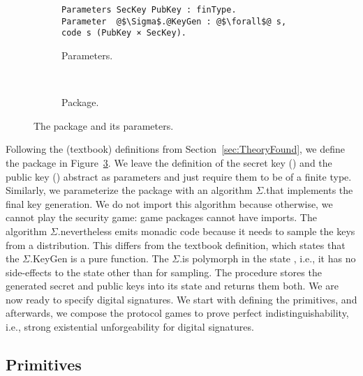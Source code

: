 \begin{figure}
	\centering
    \begin{subfigure}[b]{\columnwidth}
    \centering
       \begin{verbatim}
Parameters SecKey PubKey : finType.
Parameter  @$\Sigma$.@KeyGen : @$\forall$@ s, code s (PubKey × SecKey).
		  	\end{verbatim}
      \caption{Parameters.}
	    \label{fig:keygen:params}
    \end{subfigure}
\\[0.3cm]
  \begin{subfigure}[b]{\columnwidth}
    \centering
    
    \caption{Package.}
    \label{fig:keygen:package}
  \end{subfigure}
  \caption{
    The \pkeygen package and its parameters.
  }
  \label{fig:keygen}
\end{figure}

%
Following the (textbook) definitions from Section~\ref{sec:TheoryFound},
we define the package \pkeygen in Figure~\ref{fig:keygen}.
%
We leave the definition of the secret key (\lseckey)
and the public key (\lpubkey) abstract as parameters
and just require them to be of a finite type.
%
Similarly, we parameterize the package with an algorithm
$\Sigma$.\pkeygen that implements the final key generation.
%
We do not import this algorithm because otherwise, we cannot play
the security game: game packages cannot have imports.
%
The algorithm $\Sigma$.\pkeygen nevertheless emits monadic code
because it needs to sample the keys from a distribution.
%
This differs from the textbook definition, which states that the $\Sigma$.KeyGen
is a pure function.
%
The $\Sigma$.\pkeygen is polymorph in the state , i.e.,
it has no side-effects to the state other than for sampling.
%
The \egetpk procedure stores the generated secret and public
keys into its state and returns them both.
%
We are now ready to specify digital signatures.
%
We start with defining the primitives, and
afterwards, we compose the protocol games to prove perfect indistinguishability, 
i.e., strong existential unforgeability for digital signatures.
%

\subsection{Primitives}


